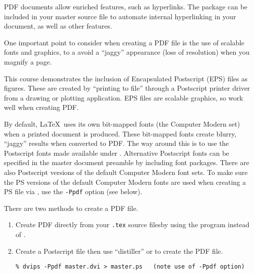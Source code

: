 PDF documents allow enriched features, such as hyperlinks. The  package can be included in your master source file to automate internal hyperlinking in your document, as well as other features.

One important point to consider when creating a PDF file is the use of scalable fonts and graphics, to a avoid a ``jaggy'' appearance (loss of resolution) when you magnify a page. 

This course demonstrates the inclusion of Encapsulated Postscript (EPS) files as figures. These are created by ``printing to file'' through a Postscript printer driver from a drawing or plotting application. EPS files are scalable graphics, so work well when creating PDF.

By default, \LaTeX\ uses its own bit-mapped fonts (the Computer Modern set) when a printed document is produced. These bit-mapped fonts create blurry, ``jaggy'' results when converted to PDF. The way around this is to use the Postscript fonts made available under \LaTeXe. Alternative Postscript fonts can be specified in the master document preamble by including font packages. There are also Postscript versions of the default Computer Modern font sets. To make sure the PS versions of the default Computer Modern fonts are used when creating a PS file via , use the \texttt{-Ppdf} option (see below).

There are two methods to create a PDF file. 
\begin{enumerate}
\item Create PDF directly from your \texttt{.tex} source filesby using the  program instead of .
\item Create a Postscript file then use  ``distiller'' or  to create the PDF file.
\begin{verbatim}
% dvips -Ppdf master.dvi > master.ps   (note use of -Ppdf option)
\end{verbatim}
\end{enumerate}
